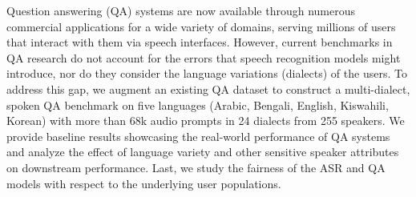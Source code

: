 Question answering (QA) systems are now available through numerous commercial applications for a wide variety of domains, serving millions of users that interact with them via speech interfaces. However, current benchmarks in QA research do not account for the errors that speech recognition models might introduce, nor do they consider the language variations (dialects) of the users. To address this gap, we augment an existing QA dataset to construct a multi-dialect, spoken QA benchmark on five languages (Arabic, Bengali, English, Kiswahili, Korean) with more than 68k  audio prompts in  24  dialects from 255 speakers.  We provide baseline results showcasing the real-world performance of QA systems and analyze the effect of language variety and other sensitive speaker attributes on downstream performance. Last, we study the fairness of the ASR and QA models with respect to the underlying user populations.
